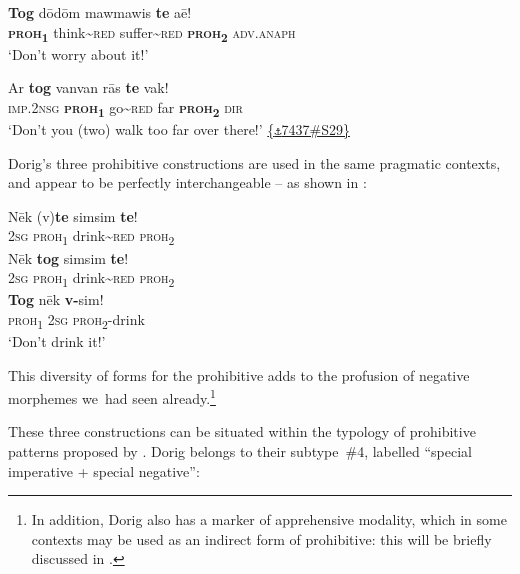 \documentclass[output=paper,colorlinks,citecolor=brown,draft]{langscibook}
\begin{document}
\ea\label{ex:dor:worry} 
    \gll  \textbf{Tog} dōdōm mawmawis \textbf{te} aē!\\ 
          \textbf{\textsc{proh}\textsubscript{1}} think{\textasciitilde}\textsc{red} suffer{\textasciitilde}\textsc{red} \textbf{\textsc{proh}}\textbf{\textsubscript{2}} \textsc{adv.anaph}\\
    \glt ‘Don’t worry about it!’  
\z 

\ea\label{ex:dor:vak}
    \gll Ar \textbf{tog} vanvan rās \textbf{te} vak!\\
         \textsc{imp.2nsg} \textbf{\textsc{proh}\textsubscript{1}} go{\textasciitilde}\textsc{red} far \textbf{\textsc{proh}\textsubscript{2}} \textsc{dir}\\
    \glt‘Don’t you (two) walk too far over there!’ \quad  \href{https://doi.org/10.24397/pangloss-0007437#S29}{\{\texttt{⚓}7437\#S29\}} 
\z  

Dorig’s three prohibitive constructions are used in the same pragmatic contexts, and appear to be perfectly interchangeable -- as shown in :

\ea\label{ex:dor:prohibs}
    \ea\label{ex:dor:40a}
        \gll  Nēk (v)\textbf{te} simsim \textbf{te}!\\ 
              \textsc{2sg} \textsc{proh\textsubscript{1}} drink{\textasciitilde}\textsc{red} \textsc{proh\textsubscript{2}}\\
    \ex\label{ex:dor:40b}
        \gll  Nēk \textbf{tog} simsim \textbf{te}!\\
              \textsc{2sg} \textsc{proh\textsubscript{1}} drink{\textasciitilde}\textsc{red} \textsc{proh\textsubscript{2}}\\
    \ex\label{ex:dor:40c}
        \gll  \textbf{Tog} nēk \textbf{v-}sim!\\
              \textsc{proh\textsubscript{1}} \textsc{2sg} \textsc{proh\textsubscript{2}}\textsc{-}drink\\
        \glt ‘Don’t drink it!’
    \z
\z

\noindent This diversity of forms for the prohibitive adds to the profusion of negative morphemes we~had seen already.\footnote{In addition, Dorig also has a marker of apprehensive modality, which in some contexts may be used as an indirect form of prohibitive: this will be briefly discussed in .}

These three constructions can be situated within the typology of prohibitive patterns proposed by \citet{AuweraEtAl2013}. Dorig belongs to their subtype~\#4, labelled “special imperative + special negative”: 
\end{document}
